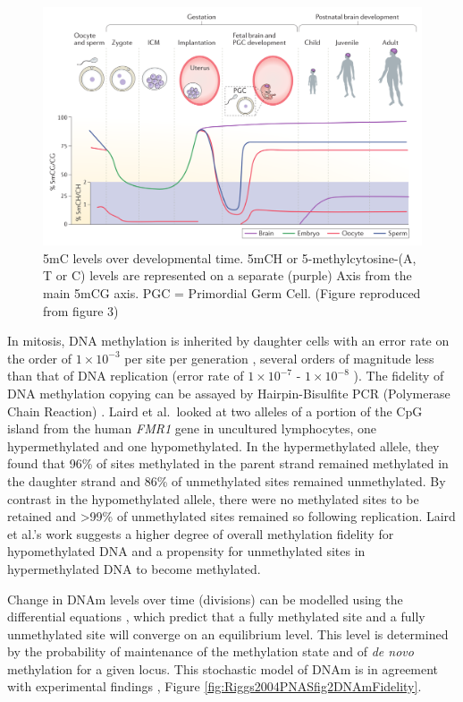 \documentclass[
]{book}
\begin{document}
\begin{figure}

{\centering \includegraphics[width=0.8\linewidth]{figs/Ciernia2016f3DNAmTime} 

}

\caption{5mC levels over developmental time. 5mCH or 5-methylcytosine-(A, T or C) levels are represented on a separate (purple) Axis from the main 5mCG axis. PGC = Primordial Germ Cell. (Figure reproduced from \citet{Ciernia2016} figure 3)}\label{fig:DNAmDevTime}
\end{figure}



In mitosis, DNA methylation is inherited by daughter cells with an error rate on the order of \(1\times10^{-3}\) per site per generation \citep{Ushijima2005}, several orders of magnitude less than that of DNA replication (error rate of \(1\times10^{-7}\) - \(1\times10^{-8}\) \citep{Kunkel2004a}). The fidelity of DNA methylation copying can be assayed by Hairpin-Bisulfite PCR (Polymerase Chain Reaction) \citep{Laird2004}. Laird et al.~looked at two alleles of a portion of the CpG island from the human \emph{FMR1} gene in uncultured lymphocytes, one hypermethylated and one hypomethylated. In the hypermethylated allele, they found that 96\% of sites methylated in the parent strand remained methylated in the daughter strand and 86\% of unmethylated sites remained unmethylated. By contrast in the hypomethylated allele, there were no methylated sites to be retained and \textgreater99\% of unmethylated sites remained so following replication. Laird et al.'s work suggests a higher degree of overall methylation fidelity for hypomethylated DNA and a propensity for unmethylated sites in hypermethylated DNA to become methylated.

Change in DNAm levels over time (divisions) can be modelled using the differential equations \citep{Pfeifer1990a}, which predict that a fully methylated site and a fully unmethylated site will converge on an equilibrium level. This level is determined by the probability of maintenance of the methylation state and of \emph{de novo} methylation for a given locus. This stochastic model of DNAm is in agreement with experimental findings \citep[\citet{Riggs2004a}]{Laird2004}, Figure \ref{fig:Riggs2004PNASfig2DNAmFidelity}.
\end{document}
